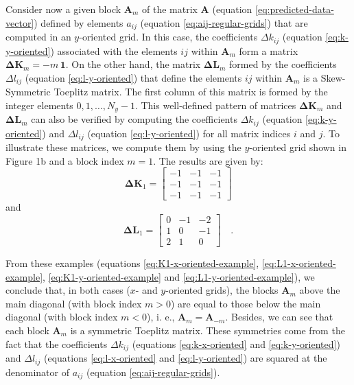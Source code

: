 \documentclass[manuscript,revised]{geophysics}
\begin{document}
Consider now a given block $\mathbf{A}_{m}$ of the matrix $\mathbf{A}$
(equation \ref{eq:predicted-data-vector}) defined by elements $a_{ij}$ 
(equation \ref{eq:aij-regular-grids}) that are computed in an $y$-oriented grid. 
In this case, the coefficients $\Delta k_{ij}$ 
(equation \ref{eq:k-y-oriented}) associated with the elements $ij$ within 
$\mathbf{A}_{m}$ form a matrix $\mathbf{\Delta K}_{m} = -m \, \mathbf{1}$.
On the other hand, the matrix $\mathbf{\Delta L}_{m}$ formed by the coefficients
$\Delta l_{ij}$ (equation \ref{eq:l-y-oriented}) that define the elements $ij$ 
within $\mathbf{A}_{m}$ is a Skew-Symmetric Toeplitz matrix.
The first column of this matrix is formed 
by the integer elements $0, 1, \dots, N_{y} - 1$.
This well-defined pattern of matrices 
$\mathbf{\Delta K}_{m}$ and $\mathbf{\Delta L}_{m}$ can also be verified by computing
the coefficients $\Delta k_{ij}$ (equation \ref{eq:k-y-oriented}) and
$\Delta l_{ij}$ (equation \ref{eq:l-y-oriented}) for all matrix indices $i$ and $j$.
To illustrate these matrices, we compute them by using the $y$-oriented grid shown in Figure 1b
and a block index $m = 1$. The results are given by:
\begin{equation}
\mathbf{\Delta K}_{1} = \begin{bmatrix}
-1 & -1 & -1 \\
-1 & -1 & -1 \\
-1 & -1 & -1 
\end{bmatrix}
\label{eq:K1-y-oriented-example}
\end{equation}
and
\begin{equation}
\mathbf{\Delta L}_{1} = \begin{bmatrix}
0 & -1 & -2 \\
1 & 0 & -1 \\
2 & 1 & 0
\end{bmatrix} \quad .
\label{eq:L1-y-oriented-example}
\end{equation}

From these examples (equations \ref{eq:K1-x-oriented-example}, \ref{eq:L1-x-oriented-example}, 
\ref{eq:K1-y-oriented-example} and \ref{eq:L1-y-oriented-example}), we conclude that,
in both cases ($x$- and $y$-oriented grids),
the blocks $\mathbf{A}_{m}$ above the main diagonal (with block index $m > 0$) are equal to those
below the main diagonal (with block index $m < 0$), i. e., 
$\mathbf{A}_{m} = \mathbf{A}_{-m}$. Besides, we can see that each block $\mathbf{A}_{m}$ is
a symmetric Toeplitz matrix. These symmetries come from the fact that the coefficients
$\Delta k_{ij}$ (equations \ref{eq:k-x-oriented} and \ref{eq:k-y-oriented}) and
$\Delta l_{ij}$ (equations \ref{eq:l-x-oriented} and \ref{eq:l-y-oriented}) are
squared at the denominator of $a_{ij}$ (equation \ref{eq:aij-regular-grids}).
\end{document}
